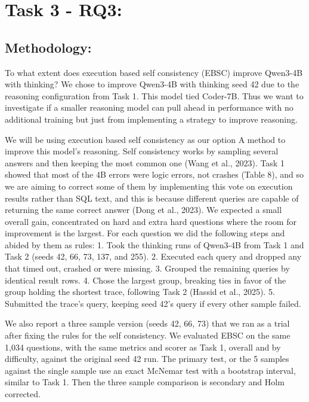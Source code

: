 \FloatBarrier
\clearpage
\section*{Task 3 - RQ3:}

\FloatBarrier
\subsection*{Methodology:}

To what extent does execution based self consistency (EBSC) improve Qwen3-4B with thinking? We chose to improve Qwen3-4B with thinking seed 42 due to the reasoning configuration from Task 1. This model tied Coder-7B. Thus we want to investigate if a smaller reasoning model can pull ahead in performance with no additional training but just from implementing a strategy to improve reasoning.

We will be using execution based self consistency as our option A method to improve this model's reasoning. Self consistency works by sampling several answers and then keeping the most common one (Wang et al., 2023). Task 1 showed that most of the 4B errors were logic errors, not crashes (Table 8), and so we are aiming to correct some of them by implementing this vote on execution results rather than SQL text, and this is because different queries are capable of returning the same correct answer (Dong et al., 2023). We expected a small overall gain, concentrated on hard and extra hard questions where the room for improvement is the largest. For each question we did the following steps and abided by them as rules: 1. Took the thinking runs of Qwen3-4B from Task 1 and Task 2 (seeds 42, 66, 73, 137, and 255). 2. Executed each query and dropped any that timed out, crashed or were missing. 3. Grouped the remaining queries by identical result rows. 4. Chose the largest group, breaking ties in favor of the group holding the shortest trace, following Task 2 (Hassid et al., 2025). 5. Submitted the trace's query, keeping seed 42's query if every other sample failed.

We also report a three sample version (seeds 42, 66, 73) that we ran as a trial after fixing the rules for the self consistency. We evaluated EBSC on the same 1,034 questions, with the same metrics and scorer as Task 1, overall and by difficulty, against the original seed 42 run. The primary test, or the 5 samples against the single sample use an exact McNemar test with a bootstrap interval, similar to Task 1. Then the three sample comparison is secondary and Holm corrected.

